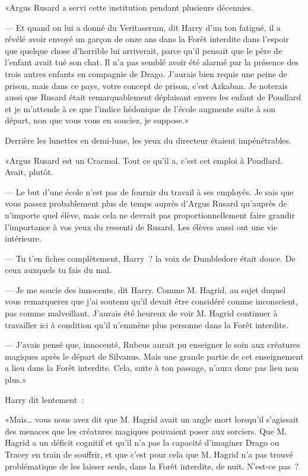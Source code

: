«Argus Rusard a servi cette institution pendant plusieurs décennies.

--- Et quand on lui a donné du Veritaserum, dit Harry d'un ton fatigué, il a révélé avoir envoyé un garçon de onze ans dans la Forêt interdite dans l'espoir que quelque chose d'horrible lui arriverait, parce qu'il pensait que le père de l'enfant avait tué son chat. Il n'a pas semblé avoir été alarmé par la présence des trois autres enfants en compagnie de Drago. J'aurais bien requis une peine de prison, mais dans ce pays, votre concept de prison, c'est Azkaban. Je noterais aussi que Rusard était remarquablement déplaisant envers les enfant de Poudlard et je m'attends à ce que l'indice hédonique de l'école augmente suite à son départ, non que vous vous en souciez, je suppose.»

Derrière les lunettes en demi-lune, les yeux du directeur étaient impénétrables.

«Argus Rusard est un Cracmol. Tout ce qu'il a, c'est cet emploi à Poudlard. Avait, plutôt.

--- Le but d'une école n'est pas de fournir du travail à ses employés. Je sais que vous passez probablement plus de temps auprès d'Argus Rusard qu'auprès de n'importe quel élève, mais cela ne devrait pas proportionnellement faire grandir l'importance à vos yeux du ressenti de Rusard. Les élèves aussi ont une vie intérieure.

--- Tu t'en fiches complètement, Harry~? la voix de Dumbledore était douce. De ceux auxquels tu fais du mal.

--- Je me soucie des innocents, dit Harry. Comme M. Hagrid, au sujet duquel vous remarquerez que j'ai soutenu qu'il devait être considéré comme inconscient, pas comme malveillant. J'aurais été heureux de voir M. Hagrid continuer à travailler ici à condition qu'il n'emmène plus personne dans la Forêt interdite.

--- J'avais pensé que, innocenté, Rubeus aurait pu enseigner le soin aux créatures magiques après le départ de Silvanus. Mais une grande partie de cet enseignement a lieu dans la Forêt interdite. Cela, suite à ton passage, n'aura donc pas lieu non plus.»

Harry dit lentement~:

«Mais… vous nous avez dit que M. Hagrid avait un angle mort lorsqu'il s'agissait des menaces que les créatures magiques pouvaient poser aux sorciers. Que M. Hagrid a un déficit cognitif et qu'il n'a pas la capacité d'imaginer Drago ou Tracey en train de souffrir, et que c'est pour cela que M. Hagrid n'a pas trouvé problématique de les laisser seuls, dans la Forêt interdite, de nuit. N'est-ce pas~?

